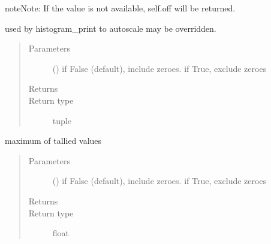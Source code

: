 \documentclass[letterpaper,10pt,english]{sphinxmanual}
\begin{document}
\begin{fulllineitems}
\begin{fulllineitems}
\begin{quote}
\begin{description}
\end{description}\end{quote}

\begin{sphinxadmonition}{note}{Note:}
If the value is not available, self.off will be returned.
\end{sphinxadmonition}

\end{fulllineitems}


\begin{fulllineitems}
\label{\detokenize{Reference:salabim.Monitor.histogram_autoscale}}
used by histogram\_print to autoscale 
may be overridden.
\begin{quote}\begin{description}
\item[{Parameters}] \leavevmode
{} () \textendash{} if False (default), include zeroes. if True, exclude zeroes

\item[{Returns}] \leavevmode
{}

\item[{Return type}] \leavevmode
tuple

\end{description}\end{quote}

\end{fulllineitems}


\begin{fulllineitems}
\label{\detokenize{Reference:salabim.Monitor.maximum}}
maximum of tallied values
\begin{quote}\begin{description}
\item[{Parameters}] \leavevmode
{} () \textendash{} if False (default), include zeroes. if True, exclude zeroes

\item[{Returns}] \leavevmode
{}

\item[{Return type}] \leavevmode
float


\end{description}
\end{quote}
\end{fulllineitems}
\end{fulllineitems}
\end{document}
